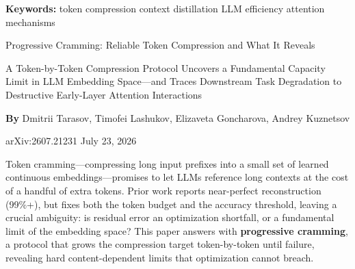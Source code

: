 \documentclass[10pt,twocolumn]{article}
\begin{document}
\setlength{\parindent}{0pt}
\setlength{\parskip}{4pt}

{\small\color{keywordgray}\textbf{Keywords:}
  token compression \textbullet{}
  context distillation \textbullet{}
  LLM efficiency \textbullet{}
  attention mechanisms}\par\vspace{4pt}

{\LARGE\bfseries\raggedright
  Progressive Cramming: Reliable Token Compression
  and What It Reveals}\par\vspace{4pt}

{\large\itshape\raggedright
  A Token-by-Token Compression Protocol Uncovers a Fundamental
  Capacity Limit in LLM Embedding Space---and Traces Downstream
  Task Degradation to Destructive Early-Layer Attention Interactions}\par\vspace{6pt}

{\small\textbf{By} Dmitrii Tarasov, Timofei Lashukov, Elizaveta Goncharova,
  Andrey Kuznetsov}\par\vspace{2pt}

{\small\color{keywordgray}arXiv:2607.21231 \textbullet{} July 23, 2026}
\par\vspace{2pt}\noindent{\color{rulered}\rule{\columnwidth}{0.6pt}}\vspace{6pt}

Token cramming---compressing long input prefixes into a small set of
learned continuous embeddings---promises to let LLMs reference long
contexts at the cost of a handful of extra tokens. Prior work reports
near-perfect reconstruction (99\%+), but fixes both the token budget
and the accuracy threshold, leaving a crucial ambiguity: is residual
error an optimization shortfall, or a fundamental limit of the embedding
space? This paper answers with \textbf{progressive cramming}, a
protocol that grows the compression target token-by-token until failure,
revealing hard content-dependent limits that optimization cannot breach.
\end{document}
